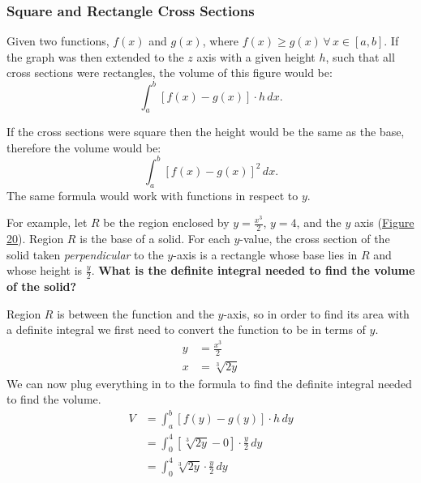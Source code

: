\documentclass[12pt]{article}
\begin{document}
\subsubsection{Square and Rectangle Cross Sections}
Given two functions, $f(x)$ and $g(x)$, where $f(x) \ge g(x) \, \forall \, x \in [a, b]$. If the graph was then extended to the $z$ axis with a given height $h$, such that all cross sections were rectangles, the volume of this figure would be:
\[ \int_a^b \left[ f(x) - g(x) \right] \cdot h \, dx. \]

If the cross sections were square then the height would be the same as the base, therefore the volume would be:
\[ \int_a^b \left[ f(x) - g(x) \right]^2 \, dx. \]
The same formula would work with functions in respect to $y$.
\bigskip

For example, let $R$ be the region enclosed by $y=\frac{x^3}{2}$, $y=4$, and the $y$ axis (\hyperref[fig:srcross]{Figure 20}). Region $R$ is the base of a solid. For each $y$-value, the cross section of the solid taken \textit{perpendicular} to the $y$-axis is a rectangle whose base lies in $R$ and whose height is $\frac{y}{2}$. \textbf{What is the definite integral needed to find the volume of the solid?}

\noindent Region $R$ is between the function and the $y$-axis, so in order to find its area with a definite integral we first need to convert the function to be in terms of $y$.
\begin{align*}
	y & = \frac{x^3}{2} \\[6pt]
	x & = \sqrt[3]{2y}
\end{align*}
We can now plug everything in to the formula to find the definite integral needed to find the volume.
\begin{align*}
	V & = \int_a^b \left[ f(y) - g(y) \right] \cdot h \, dy                \\
	& = \int_0^4 \left[ \sqrt[3]{2y} - 0 \right] \cdot \frac{y}{2} \, dy \\[6pt]
	& = \int_0^4 \sqrt[3]{2y} \cdot \frac{y}{2} \, dy
\end{align*}
\end{document}
